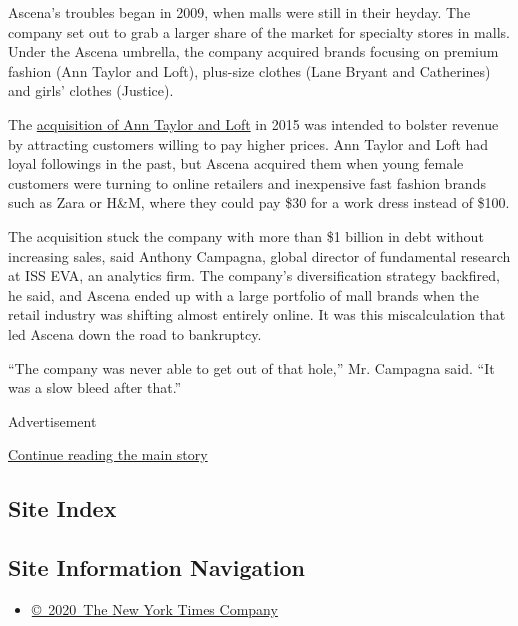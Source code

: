 Ascena's troubles began in 2009, when malls were still in their heyday.
The company set out to grab a larger share of the market for specialty
stores in malls. Under the Ascena umbrella, the company acquired brands
focusing on premium fashion (Ann Taylor and Loft), plus-size clothes
(Lane Bryant and Catherines) and girls' clothes (Justice).

The
\href{https://www.nytimes3xbfgragh.onion/2015/05/19/business/dealbook/ann-taylor-parent-to-be-bought-for-2-16-billion.html}{acquisition
of Ann Taylor and Loft} in 2015 was intended to bolster revenue by
attracting customers willing to pay higher prices. Ann Taylor and Loft
had loyal followings in the past, but Ascena acquired them when young
female customers were turning to online retailers and inexpensive fast
fashion brands such as Zara or H\&M, where they could pay \$30 for a
work dress instead of \$100.

The acquisition stuck the company with more than \$1 billion in debt
without increasing sales, said Anthony Campagna, global director of
fundamental research at ISS EVA, an analytics firm. The company's
diversification strategy backfired, he said, and Ascena ended up with a
large portfolio of mall brands when the retail industry was shifting
almost entirely online. It was this miscalculation that led Ascena down
the road to bankruptcy.

``The company was never able to get out of that hole,'' Mr. Campagna
said. ``It was a slow bleed after that.''

Advertisement

\protect\hyperlink{after-bottom}{Continue reading the main story}

\hypertarget{site-index}{%
\subsection{Site Index}\label{site-index}}

\hypertarget{site-information-navigation}{%
\subsection{Site Information
Navigation}\label{site-information-navigation}}

\begin{itemize}
\tightlist
\item
  \href{https://help.nytimes3xbfgragh.onion/hc/en-us/articles/115014792127-Copyright-notice}{©~2020~The
  New York Times Company}
\end{itemize}

